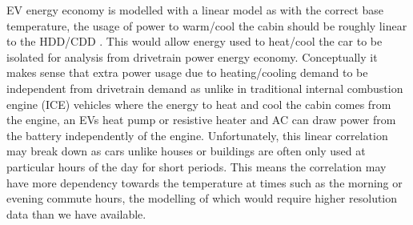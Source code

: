 \documentclass[
]{article}
\begin{document}
EV energy economy is modelled with a linear model as with the correct
base temperature, the usage of power to warm/cool the cabin should be
roughly linear to the HDD/CDD \cite{HDD_est}. This would allow energy
used to heat/cool the car to be isolated for analysis from drivetrain
power energy economy. Conceptually it makes sense that extra power usage
due to heating/cooling demand to be independent from drivetrain demand
as unlike in traditional internal combustion engine (ICE) vehicles where
the energy to heat and cool the cabin comes from the engine, an EVs heat
pump or resistive heater and AC can draw power from the battery
independently of the engine. Unfortunately, this linear correlation may
break down as cars unlike houses or buildings are often only used at
particular hours of the day for short periods. This means the
correlation may have more dependency towards the temperature at times
such as the morning or evening commute hours, the modelling of which
would require higher resolution data than we have available.
\end{document}
